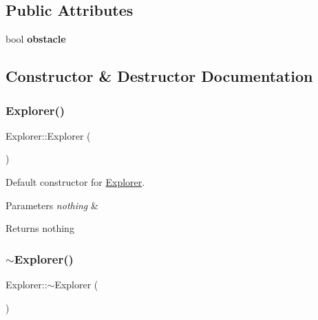 \subsection*{Public Attributes}
\begin{DoxyCompactItemize}
\item 
\mbox{\label{classExplorer_aae77ad5be0e6da499ea662ca7bbd1d42}} 
bool {\bfseries obstacle}
\end{DoxyCompactItemize}


\subsection{Constructor \& Destructor Documentation}
\mbox{\label{classExplorer_acbedef0262785b6983d1fe9b4f2c6242}} 
\subsubsection{\texorpdfstring{Explorer()}{Explorer()}}
{\footnotesize\ttfamily Explorer\+::\+Explorer (\begin{DoxyParamCaption}{ }\end{DoxyParamCaption})}



Default constructor for \mbox{\hyperlink{classExplorer}{Explorer}}. 


\begin{DoxyParams}{Parameters}
{\em nothing} & \\
\hline
\end{DoxyParams}
\begin{DoxyReturn}{Returns}
nothing 
\end{DoxyReturn}
\mbox{\label{classExplorer_aa1b0a71e92e003e9162a5ba99d843392}} 
\subsubsection{\texorpdfstring{$\sim$\+Explorer()}{~Explorer()}}
{\footnotesize\ttfamily Explorer\+::$\sim$\+Explorer (\begin{DoxyParamCaption}{ }\end{DoxyParamCaption})}



